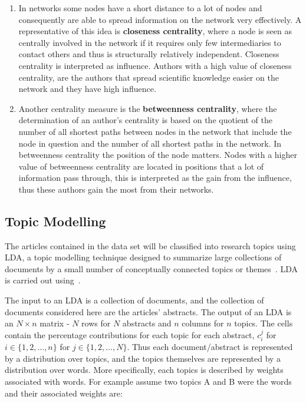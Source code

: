 \begin{enumerate}
    \item In networks some nodes have a short distance to a lot of nodes and
    consequently are able to spread information on the network very effectively.
    A representative of this idea is \textbf{closeness centrality}, where a node
    is seen as centrally involved in the network if it requires only few
    intermediaries to contact others and thus is structurally relatively
    independent. Closeness centrality is interpreted as influence. Authors with a high
    value of closeness centrality, are the authors that spread scientific
    knowledge easier on the network and they have high influence.
    \item Another centrality measure is the \textbf{betweenness centrality},
    where the determination of an author's centrality is based on the quotient
    of the number of all shortest paths between nodes in the network that
    include the node in question and the number of all shortest paths in the
    network. In betweenness centrality the position of the node matters. Nodes
    with a higher value of betweenness centrality are located in positions that
    a lot of information pass through, this is interpreted as the gain from
    the influence, thus these authors gain the most from their networks.
\end{enumerate}

\subsection{Topic Modelling}\label{section:lda_introduction}

The articles contained in the data set will be classified
into research topics using LDA, a topic modelling technique
designed to summarize large collections of documents by a small number of
conceptually connected topics or themes~\cite{Blei2003, Grimmer2013}. LDA is
carried out using~\cite{rehurek_lrec}.

The input to an LDA is a collection of documents, and the collection of
documents considered here are the articles' abstracts. The output of an LDA is
an \(N \times n\) matrix - \(N\) rows for \(N\) abstracts and \(n\) columns for
\(n\) topics. The cells contain the percentage contributions for each topic for
each abstract, \(c_i^ j\) for \(i \in \{1, 2, \dots, n\}\) for \(j \in \{1, 2,
\dots, N\}\). Thus each document/abstract is represented by a distribution over
topics, and the topics themselves are represented by a distribution over words.
More specifically, each topics is described by weights associated with words.
For example assume two topics A and B were the words and their associated weights
are:

